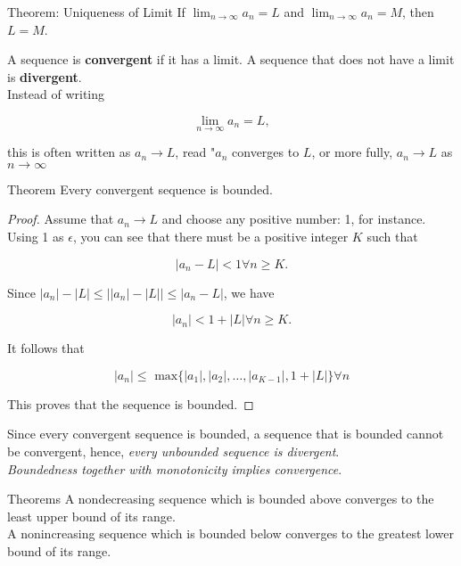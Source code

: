         \begin{theorem}{Theorem: Uniqueness of Limit}
            If $\lim_{n\to\infty} a_n = L$ and $\lim_{n\to\infty} a_n = M$, then $L=M$.
        \end{theorem}

        A sequence is \textbf{convergent} if it has a limit. A sequence that does not have a limit is \textbf{divergent}. \\

        Instead of writing

        \[
            \lim_{n\to\infty} a_n = L,
        \]

        this is often written as $a_n \to L$, read "$a_n$ converges to $L$, or more fully, $a_n \to L$ as $n\to\infty$

        \begin{theorem}{Theorem}
            Every convergent sequence is bounded.
        \end{theorem}

        \begin{proof}
            Assume that $a_n \to L$ and choose any positive number: 1, for instance. Using 1 as $\epsilon$, you can see that there must be a positive integer $K$ such that

            \[
                |a_n - L| < 1 \forall n \geq K.
            \]

            Since $|a_n| - |L| \leq \left| |a_n| - |L|\right| \leq |a_n - L|$, we have

            \[
                |a_n| < 1 + |L| \forall n \geq K.
            \]

            It follows that

            \[
                |a_n| \leq \text{ max}\{|a_1|, |a_2|,\dots,|a_{K-1}|, 1 + |L|\} \forall n
            \]

            This proves that the sequence is bounded.
        \end{proof}

        Since every convergent sequence is bounded, a sequence that is bounded cannot be convergent, hence, \textit{every unbounded sequence is divergent}. \\

        \textit{Boundedness together with monotonicity implies convergence}.

        \begin{theorem}{Theorems}
            A nondecreasing sequence which is bounded above converges to the least upper bound of its range. \\
            A nonincreasing sequence which is bounded below converges to the greatest lower bound of its range.
        \end{theorem}


